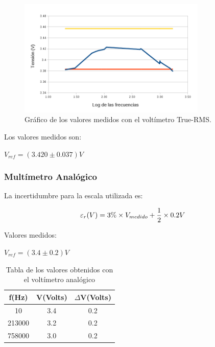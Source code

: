 \documentclass{article}
\begin{document}
\begin{figure}[h]
\centering
\includegraphics[width=0.80\textwidth]{images/tablaTRUE.png}
\caption{Gráfico de los valores medidos con el voltímetro True-RMS.}
\end{figure}
\bigskip\bigskip\bigskip



Los valores medidos son:

\begin{center}
	$V_{ref} = (3.420 \pm 0.037) V$
\end{center}
\bigskip\bigskip



\subsubsection{Multímetro Analógico}


La incertidumbre para la escala utilizada es:

\begin{equation}
 	\varepsilon_r(V) = 3\%\times V_{medido} + {1 \over 2}\times 0.2V
\end{equation}
\medskip

Valores medidos:

\begin{center}
$V_{ref} = (3.4 \pm 0.2) V$
\end{center}


\newpage
\begin{table}[h]
	\begin{center}
	\begin{tabular}{|c|c|c|}\hline
	\textbf{f(Hz)} & \textbf{V(Volts)} & \textbf{$\Delta$V(Volts)} \\ \hline
	10 & 3.4 & 0.2\\ \hline
    213000 & 3.2 & 0.2\\ \hline
    758000 & 3.0 & 0.2\\ \hline
	\end{tabular}
	\caption{Tabla de los valores obtenidos con el voltímetro analógico}
	\end{center}
\end{table}
\bigskip
\end{document}
